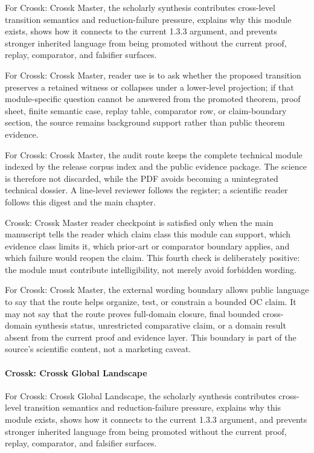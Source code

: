 For Crossk: Crossk Master, the scholarly synthesis contributes cross-level transition semantics and reduction-failure pressure, explains why this module exists, shows how it connects to the current 1.3.3 argument, and prevents stronger inherited language from being promoted without the current proof, replay, comparator, and falsifier surfaces.


For Crossk: Crossk Master, reader use is to ask whether the proposed transition preserves a retained witness or collapses under a lower-level projection; if that module-specific question cannot be answered from the promoted theorem, proof sheet, finite semantic case, replay table, comparator row, or claim-boundary section, the source remains background support rather than public theorem evidence.


For Crossk: Crossk Master, the audit route keeps the complete technical module indexed by the release corpus index and the public evidence package. The science is therefore not discarded, while the PDF avoids becoming a unintegrated technical dossier. A line-level reviewer follows the register; a scientific reader follows this digest and the main chapter.


Crossk: Crossk Master reader checkpoint is satisfied only when the main manuscript tells the reader which claim class this module can support, which evidence class limits it, which prior-art or comparator boundary applies, and which failure would reopen the claim. This fourth check is deliberately positive: the module must contribute intelligibility, not merely avoid forbidden wording.


For Crossk: Crossk Master, the external wording boundary allows public language to say that the route helps organize, test, or constrain a bounded OC claim. It may not say that the route proves full-domain closure, final bounded cross-domain synthesis status, unrestricted comparative claim, or a domain result absent from the current proof and evidence layer. This boundary is part of the source's scientific content, not a marketing caveat.


\paragraph{Crossk: Crossk Global Landscape}

For Crossk: Crossk Global Landscape, the scholarly synthesis contributes cross-level transition semantics and reduction-failure pressure, explains why this module exists, shows how it connects to the current 1.3.3 argument, and prevents stronger inherited language from being promoted without the current proof, replay, comparator, and falsifier surfaces.


